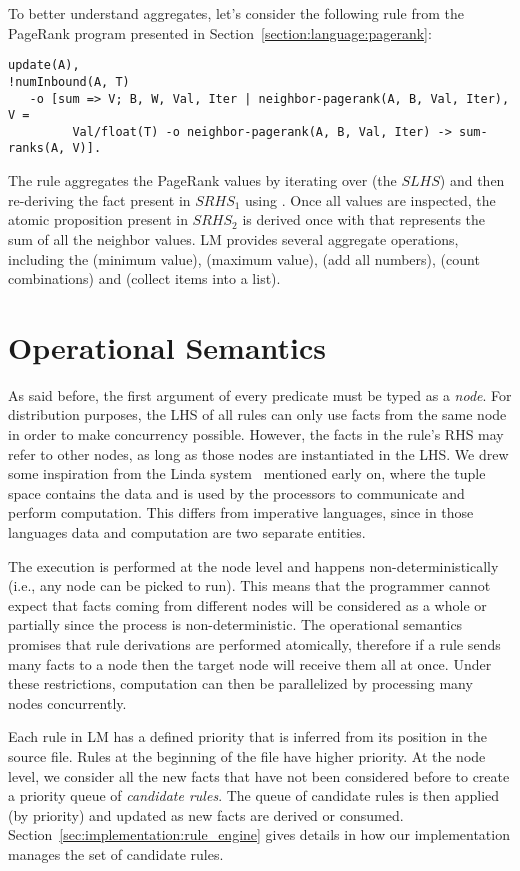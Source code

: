 To better understand aggregates, let's consider the following rule from the
PageRank program presented in Section~\ref{section:language:pagerank}:

\begin{Verbatim}[fontsize=\codesize]
update(A),
!numInbound(A, T)
   -o [sum => V; B, W, Val, Iter | neighbor-pagerank(A, B, Val, Iter), V =
         Val/float(T) -o neighbor-pagerank(A, B, Val, Iter) -> sum-ranks(A, V)].
\end{Verbatim}

The rule aggregates the PageRank values  by iterating over
 (the $SLHS$) and then re-deriving the
fact present in $SRHS_1$ using . Once all
values are inspected, the atomic proposition  present in
$SRHS_2$ is derived once with  that represents the sum of all the
neighbor values. LM provides several aggregate operations, including the
 (minimum value),  (maximum value),  (add all
numbers),  (count combinations) and  (collect items
into a list).

\section{Operational Semantics}

As said before, the first argument of every predicate must be typed as a
\emph{node}.  For distribution purposes, the LHS of all rules can only use facts
from the same node in order to make concurrency possible. However, the facts in
the rule's RHS may refer to other nodes, as long as those nodes are instantiated
in the LHS. We drew some inspiration from the Linda system~\cite{linda}
mentioned early on, where the tuple space contains the data and is used by the
processors to communicate and perform computation. This differs from imperative
languages, since in those languages data and computation are two separate
entities.

The execution is performed at the node level and happens non-deterministically
(i.e., any node can be picked to run). This means that the programmer cannot
expect that facts coming from different nodes will be considered as a whole or
partially since the process is non-deterministic. The operational semantics
promises that rule derivations are performed atomically, therefore if a rule
sends many facts to a node then the target node will receive them all at once.
Under these restrictions, computation can then be parallelized by processing
many nodes concurrently.

Each rule in LM has a defined priority that is inferred from its position in the
source file.  Rules at the beginning of the file have higher priority. At the
node level, we consider all the new facts that have not been considered before
to create a priority queue of \emph{candidate rules}. The queue of candidate
rules is then applied (by priority) and updated as new facts are derived or
consumed.  Section~\ref{sec:implementation:rule_engine} gives details in how our
implementation manages the set of candidate rules.

